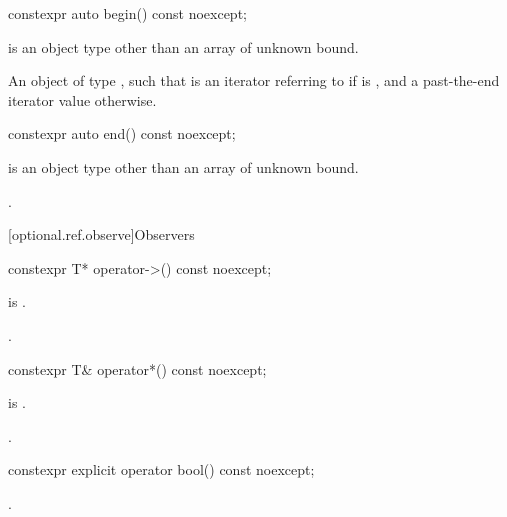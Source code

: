 \begin{itemdecl}
constexpr auto begin() const noexcept;
\end{itemdecl}

\begin{itemdescr}
\pnum
\constraints
{} is an object type other than an array of unknown bound.

\pnum
\returns
  An object  of type , such that
   is an iterator referring to 
  if  is , and
  a past-the-end iterator value otherwise.
\end{itemdescr}

\begin{itemdecl}
constexpr auto end() const noexcept;
\end{itemdecl}

\begin{itemdescr}
\pnum
\constraints
{} is an object type other than an array of unknown bound.

\pnum
\returns
{}.
\end{itemdescr}

[optional.ref.observe]{Observers}

\begin{itemdecl}
constexpr T* operator->() const noexcept;
\end{itemdecl}

\begin{itemdescr}
\pnum
\hardexpects
{} is .

\pnum
\returns
{}.

\end{itemdescr}

\begin{itemdecl}
constexpr T& operator*() const noexcept;
\end{itemdecl}

\begin{itemdescr}
\pnum
\hardexpects
{} is .

\pnum
\returns
{}.
\end{itemdescr}

\begin{itemdecl}
constexpr explicit operator bool() const noexcept;
\end{itemdecl}

\begin{itemdescr}
\pnum
\returns
{}.
\end{itemdescr}

